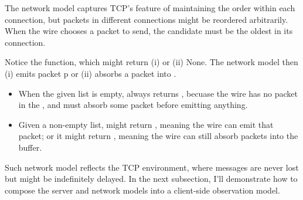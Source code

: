 The network model captures TCP's feature of maintaining the order within each
connection, but packets in different connections might be reordered arbitrarily.
When the wire chooses a packet to send, the candidate must be the oldest in its
connection.

Notice the  function, which might return (i)  or (ii)
\ilc None.  The network model then (i) emits packet \ilc p or (ii) absorbs a
packet into .

\begin{itemize}
\item When the given list  is empty,  always returns
  , becuase the wire has no packet in the , and must
  absorb some packet before emitting anything.
\item Given a non-empty list,  might return ,
  meaning the wire can emit that packet; or it might return , meaning
  the wire can still absorb packets into the buffer.
\end{itemize}

Such network model reflects the TCP environment, where messages are never lost
but might be indefinitely delayed.  In the next subsection, I'll demonstrate how
to compose the server and network models into a client-side observation model.

